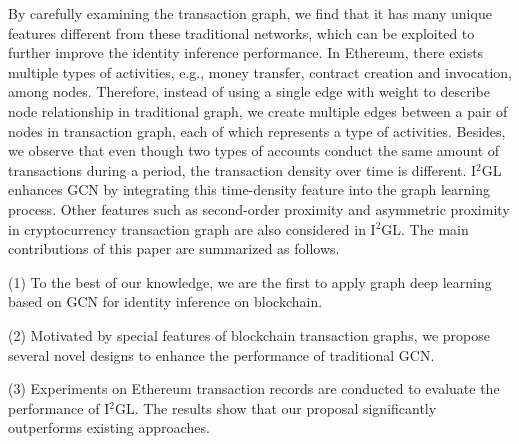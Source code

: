 
 By carefully examining the transaction graph, we find that it has many unique features different from these traditional networks, which can be exploited to further improve the identity inference performance. In Ethereum, there exists multiple types of activities, e.g., money transfer, contract creation and invocation, among nodes. Therefore, instead of using a single edge with weight to describe node relationship in traditional graph, we create multiple edges between a pair of nodes in transaction graph, each of which represents a type of activities. Besides, we observe that even though two types of accounts conduct the same amount of transactions during a period, the transaction density over time is different. I$^2$GL enhances GCN by integrating this time-density feature into the graph learning process. Other features such as second-order proximity and asymmetric proximity in cryptocurrency transaction graph are also considered in I$^2$GL. The main contributions of this paper are summarized as follows.

(1) To the best of our knowledge, we are the first to apply graph deep learning based on GCN for identity inference on blockchain. 

(2) Motivated by special features of blockchain transaction graphs, we propose several novel designs to enhance the performance of traditional GCN.

(3) Experiments on Ethereum transaction records are conducted to evaluate the performance of I$^2$GL. The results show that our proposal significantly outperforms existing approaches.

